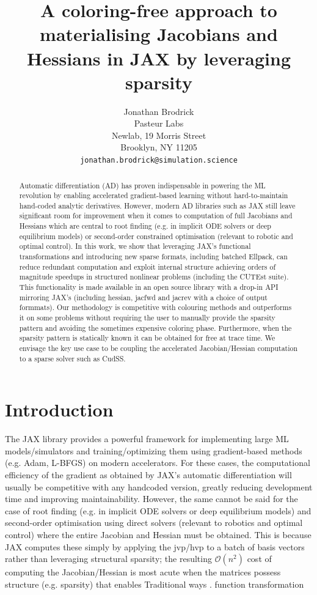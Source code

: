 \documentclass{article}
\title{A coloring-free approach to materialising Jacobians and Hessians in JAX by leveraging sparsity}
\author{%
  Jonathan Brodrick\\
  Pasteur Labs\\
  Newlab, 19 Morris Street\\
  Brooklyn, NY 11205 \\
  \texttt{jonathan.brodrick@simulation.science} \\
}
\begin{document}
\maketitle


\begin{abstract}
Automatic differentiation (AD) has proven indispensable in powering the ML revolution by enabling accelerated
gradient-based learning without hard-to-maintain hand-coded analytic derivatives.
However, modern AD libraries such as JAX still leave significant room for improvement when it comes to computation of 
full Jacobians and Hessians which are central to root finding (e.g. in implicit ODE solvers or deep equilibrium models)
or second-order constrained optimisation (relevant to robotic and optimal control).
In this work, we show that leveraging JAX's functional transformations and introducing new sparse formats,
including batched Ellpack, can reduce redundant computation and exploit internal structure achieving orders of 
magnitude speedups in structured nonlinear problems (including the CUTEst suite).
This functionality is made available in an open source library with a drop-in API mirroring JAX's
(including hessian, jacfwd and jacrev with a choice of output formmats).
Our methodology is competitive with colouring methods and outperforms it on some problems
without requiring the user to manually provide the sparsity pattern 
and avoiding the sometimes expensive coloring phase.
Furthermore, when the sparsity pattern is statically known it can be obtained for free at trace time.
We envisage the key use case to be coupling the accelerated Jacobian/Hessian computation to a sparse solver such as 
CudSS.
\end{abstract}

\section{Introduction}

The JAX library provides a powerful framework for implementing large ML models/simulators 
and training/optimizing them using gradient-based methods (e.g. Adam, L-BFGS) on modern accelerators.
For these cases, the computational efficiency of the gradient as obtained by JAX's automatic differentiation will usually be competitive with
any handcoded version, greatly reducing development time and improving maintainability.
However, the same cannot be said for the case of root finding (e.g. in implicit ODE solvers or deep equilibrium models) 
 and second-order optimisation using direct solvers (relevant to robotics and optimal control)
 where the entire Jacobian and Hessian must be obtained.
This is because JAX computes these simply by applying the jvp/hvp to a batch of basis vectors rather than 
leveraging structural sparsity;
the resulting $\mathcal{O}(n^2)$ cost of computing the Jacobian/Hessian is most acute when 
the matrices possess structure (e.g. sparsity) that enables 
Traditional ways . 
function transformation
\end{document}
